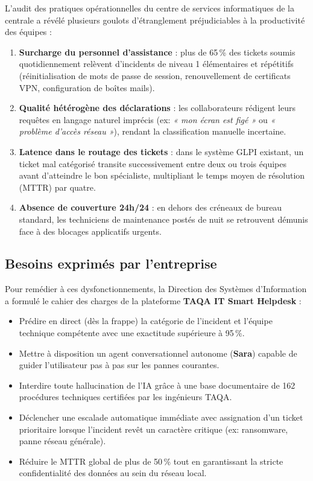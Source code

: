 \documentclass[12pt, a4paper, oneside]{report}
\begin{document}
L'audit des pratiques opérationnelles du centre de services informatiques de la centrale a révélé plusieurs goulots d'étranglement préjudiciables à la productivité des équipes :
\begin{enumerate}
  \item \textbf{Surcharge du personnel d'assistance} : plus de 65\,\% des tickets soumis quotidiennement relèvent d'incidents de niveau 1 élémentaires et répétitifs (réinitialisation de mots de passe de session, renouvellement de certificats VPN, configuration de boîtes mails).
  \item \textbf{Qualité hétérogène des déclarations} : les collaborateurs rédigent leurs requêtes en langage naturel imprécis (ex: \textit{« mon écran est figé »} ou \textit{« problème d'accès réseau »}), rendant la classification manuelle incertaine.
  \item \textbf{Latence dans le routage des tickets} : dans le système GLPI existant, un ticket mal catégorisé transite successivement entre deux ou trois équipes avant d'atteindre le bon spécialiste, multipliant le temps moyen de résolution (MTTR) par quatre.
  \item \textbf{Absence de couverture 24h/24} : en dehors des créneaux de bureau standard, les techniciens de maintenance postés de nuit se retrouvent démunis face à des blocages applicatifs urgents.
\end{enumerate}

\subsection{Besoins exprimés par l'entreprise}

Pour remédier à ces dysfonctionnements, la Direction des Systèmes d'Information a formulé le cahier des charges de la plateforme \textbf{TAQA IT Smart Helpdesk} :
\begin{itemize}
  \item Prédire en direct (dès la frappe) la catégorie de l'incident et l'équipe technique compétente avec une exactitude supérieure à 95\,\%.
  \item Mettre à disposition un agent conversationnel autonome (\textbf{Sara}) capable de guider l'utilisateur pas à pas sur les pannes courantes.
  \item Interdire toute hallucination de l'IA grâce à une base documentaire de 162 procédures techniques certifiées par les ingénieurs TAQA.
  \item Déclencher une escalade automatique immédiate avec assignation d'un ticket prioritaire lorsque l'incident revêt un caractère critique (ex: ransomware, panne réseau générale).
  \item Réduire le MTTR global de plus de 50\,\% tout en garantissant la stricte confidentialité des données au sein du réseau local.
\end{itemize}
\end{document}
